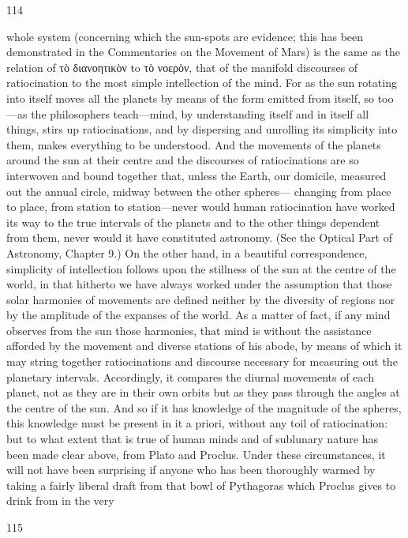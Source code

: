 \documentclass{article}
\begin{document}
114

whole system (concerning which the sun-spots are evidence; this has
been demonstrated in the Commentaries on the Movement of Mars) is
the same as the relation of τὸ διανοητικὸν to τὸ νοερὸν, that of the
manifold discourses of ratiocination to the most simple intellection of
the mind. For as the sun rotating into itself moves all the planets by
means of the form emitted from itself, so too—as the philosophers
teach—mind, by understanding itself and in itself all things, stirs up
ratiocinations, and by dispersing and unrolling its simplicity into them,
makes everything to be understood. And the movements of the planets
around the sun at their centre and the discourses of ratiocinations are so
interwoven and bound together that, unless the Earth, our domicile,
measured out the annual circle, midway between the other spheres—
changing from place to place, from station to station—never would
human ratiocination have worked its way to the true intervals of the
planets and to the other things dependent from them, never would it
have constituted astronomy. (See the Optical Part of Astronomy,
Chapter 9.)
On the other hand, in a beautiful correspondence, simplicity of
intellection follows upon the stillness of the sun at the centre of the
world, in that hitherto we have always worked under the assumption that
those solar harmonies of movements are defined neither by the diversity
of regions nor by the amplitude of the expanses of the world.
As a matter of fact, if any mind observes from the sun those harmonies,
that mind is without the assistance afforded by the movement and
diverse stations of his abode, by means of which it may string together
ratiocinations and discourse necessary for measuring out the planetary
intervals. Accordingly, it compares the diurnal movements of each
planet, not as they are in their own orbits but as they pass through the
angles at the centre of the sun. And so if it has knowledge of the
magnitude of the spheres, this knowledge must be present in it a priori,
without any toil of ratiocination: but to what extent that is true of human
minds and of sublunary nature has been made clear above, from Plato
and Proclus.
Under these circumstances, it will not have been surprising if anyone
who has been thoroughly warmed by taking a fairly liberal draft from
that bowl of Pythagoras which Proclus gives to drink from in the very


115
\end{document}
